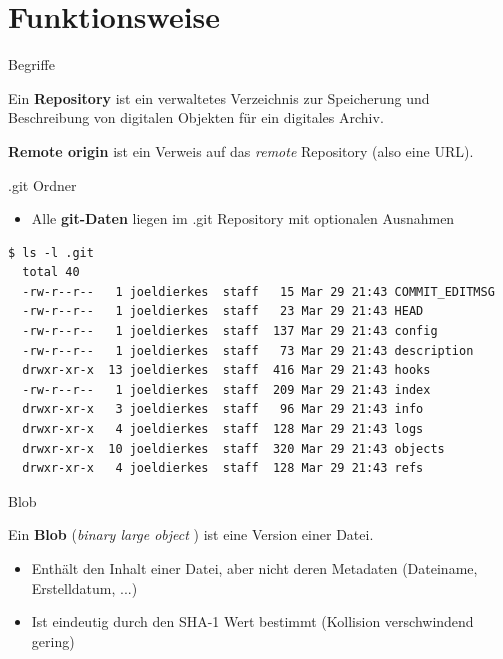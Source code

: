 \section{Funktionsweise}

\begin{frame}{Begriffe}
  \begin{Definition}
    Ein \textbf{Repository} ist ein verwaltetes Verzeichnis zur Speicherung und Beschreibung von digitalen Objekten für ein digitales Archiv.\cite{WREP}
  \end{Definition}

  \begin{Definition}
    \textbf{Remote origin} ist ein Verweis auf das \textit{remote} Repository (also eine URL).
  \end{Definition}
\end{frame}

\begin{frame}[fragile]{.git Ordner}
  \begin{itemize}
    \item Alle \textbf{git-Daten} liegen im .git Repository mit optionalen Ausnahmen
  \end{itemize}
  \pause
  \begin{lstlisting}[basicstyle=\tiny]
  $ ls -l .git
  total 40
  -rw-r--r--   1 joeldierkes  staff   15 Mar 29 21:43 COMMIT_EDITMSG
  -rw-r--r--   1 joeldierkes  staff   23 Mar 29 21:43 HEAD
  -rw-r--r--   1 joeldierkes  staff  137 Mar 29 21:43 config
  -rw-r--r--   1 joeldierkes  staff   73 Mar 29 21:43 description
  drwxr-xr-x  13 joeldierkes  staff  416 Mar 29 21:43 hooks
  -rw-r--r--   1 joeldierkes  staff  209 Mar 29 21:43 index
  drwxr-xr-x   3 joeldierkes  staff   96 Mar 29 21:43 info
  drwxr-xr-x   4 joeldierkes  staff  128 Mar 29 21:43 logs
  drwxr-xr-x  10 joeldierkes  staff  320 Mar 29 21:43 objects
  drwxr-xr-x   4 joeldierkes  staff  128 Mar 29 21:43 refs
  \end{lstlisting}
\end{frame}

\begin{frame}{Blob}
  \begin{Definition}
    Ein \textbf{Blob} (\glqq \textit{binary large object} \grqq ) ist eine Version einer Datei.
  \end{Definition}
  \begin{itemize}
    \pause
    \item Enthält den Inhalt einer Datei, aber nicht deren Metadaten (Dateiname, Erstelldatum, ...)
    \pause
    \item Ist eindeutig durch den SHA-1 Wert bestimmt (Kollision verschwindend gering)
  \end{itemize}
\end{frame}

